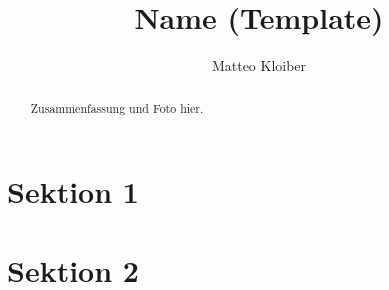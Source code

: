\documentclass[12pt,a4paper]{article}
\title{Name (Template)}
\author{Matteo Kloiber}
\date{\creationDate}
\begin{document}
    \thispagestyle{fancy}
\maketitle

\begin{abstract}
    Zusammenfassung und Foto hier.
\end{abstract}

\newpage
\tableofcontents
\newpage

\section*{Sektion 1}
\Blindtext

\section*{Sektion 2}
\blindtext
\end{document}
